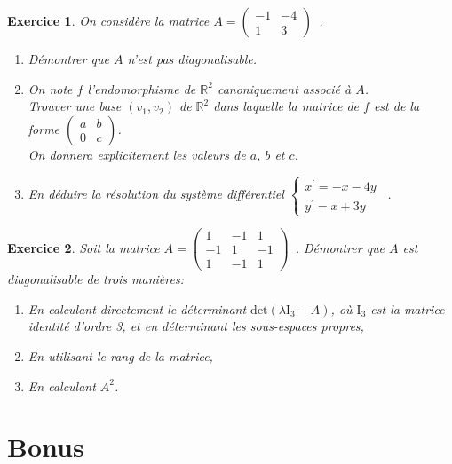 \documentclass[12pt,a4paper]{article}
\theoremstyle{break}
\theoremstyle{break}
\newtheorem{Exo}{Exercice}
\begin{document}
\begin{Exo}
	On considère la matrice $A=\begin{pmatrix}
		-1 & -4 \\ 
		1 & 3
	\end{pmatrix}$~.
	
	\begin{enumerate}
		\item Démontrer que $A$ n'est pas diagonalisable.
		
		\item On note $f$ l'endomorphisme de $\mathbb{R}^{2}$ canoniquement associ\'{e} \`{a} $A$. \\Trouver une base $\left( v_{1},v_{2}\right)$ de $\mathbb{R}^{2}$ dans laquelle la matrice de $f$ est de la forme $\begin{pmatrix}
			a & b \\ 
			0 & c
		\end{pmatrix}$.\\
		On donnera explicitement les valeurs de $a$, $b$ et $c$.
		
		\item En déduire la résolution du syst\`{e}me différentiel $\left\{
		\begin{array}{l}
			x^{\prime }=-x-4y \\ 
			y^{\prime }=x+3y
		\end{array}
		\right.$~.
	\end{enumerate}
\end{Exo}



\begin{Exo}
	Soit la matrice $A=\begin{pmatrix}
	1 & -1 & 1 \\ 
	-1 & 1 & -1 \\ 
	1 & -1 & 1
\end{pmatrix}$~.
 Démontrer que $A$ est diagonalisable de trois manières:
	\begin{enumerate}
		\item En calculant directement le déterminant $\text{det}(\lambda \mathrm{I}_3-A)$, où $\mathrm{I}_3$ est la matrice identité d'ordre 3, et en déterminant les sous-espaces propres,
		\item En utilisant le rang de la matrice,
		\item En calculant $A^2$.
	\end{enumerate}
\end{Exo}

\section*{Bonus}
\end{document}
